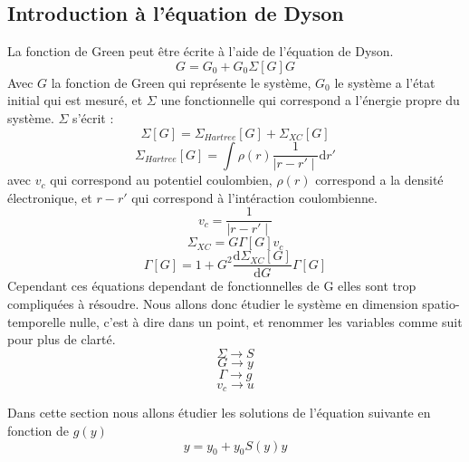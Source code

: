 \documentclass[12pt]{article}
\begin{document}
\subsection{Introduction \`a l'\'equation de Dyson}
La fonction de Green peut \^etre \'ecrite \`a l'aide de l'\'equation de Dyson. 
\begin{equation}
	G = G_0 + G_0 \Sigma[G] G
\end{equation}
Avec $G$ la fonction de Green qui repr\'esente le syst\`eme, $G_0$ le syst\`eme a l'\'etat initial qui est mesur\'e, et $\Sigma$ une fonctionnelle qui correspond a l'\'energie propre du syst\`eme.
$\Sigma$ s'\'ecrit :
\begin{equation}
	\Sigma[G] = \Sigma_{Hartree}[G] + \Sigma_{XC}[G]
\end{equation}
\begin{equation}
	\Sigma_{Hartree}[G] = \int \rho(r) \frac{1}{\mid r - r'\mid }\mathrm{d}r' 
\end{equation}
avec $v_c$ qui correspond au potentiel coulombien, $\rho(r)$ correspond a la densit\'e \'electronique, et $r-r'$
qui correspond à l'int\'eraction coulombienne.
\begin{equation}
	v_c =  \frac{1}{\mid r - r'\mid }
\end{equation}
\begin{equation}
	\Sigma_{XC} = G \Gamma[G] v_c
\end{equation}
\begin{equation}
	\Gamma[G] = 1 + G^2 \frac{\mathrm{d} \Sigma_{XC}[G]}{\mathrm{d}G} \Gamma[G]
\end{equation}
Cependant ces \'equations dependant de fonctionnelles de G elles sont trop compliqu\'ees \`a r\'esoudre. 
Nous allons donc \'etudier le syst\`eme en dimension spatio-temporelle nulle, c'est \`a dire dans un point, et renommer les variables comme suit
pour plus de clart\'e.
\begin{equation}
	\Sigma \longrightarrow S
\end{equation}
\begin{equation}
	G \longrightarrow y
\end{equation}
\begin{equation}
	\Gamma \longrightarrow g
\end{equation}
\begin{equation}
	v_c \longrightarrow u
\end{equation}

Dans cette section nous allons \'etudier les solutions de l'\'equation suivante en fonction de $g(y)$
\begin{equation}
\label{dyson}
	y = y_0 + y_0 S(y) y
\end{equation}
\end{document}
